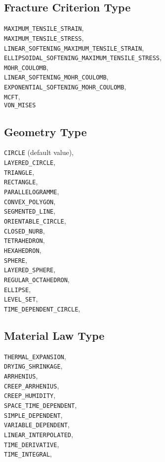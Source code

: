 \documentclass[10pt]{article}
\begin{document}
\subsection{Fracture Criterion Type}

\verb+MAXIMUM_TENSILE_STRAIN+,\\
\verb+MAXIMUM_TENSILE_STRESS+,\\
\verb+LINEAR_SOFTENING_MAXIMUM_TENSILE_STRAIN+,\\
\verb+ELLIPSOIDAL_SOFTENING_MAXIMUM_TENSILE_STRESS+,\\
\verb+MOHR_COULOMB+,\\
\verb+LINEAR_SOFTENING_MOHR_COULOMB+,\\
\verb+EXPONENTIAL_SOFTENING_MOHR_COULOMB+,\\
\verb+MCFT+,\\
\verb+VON_MISES+

\subsection{Geometry Type}

\verb+CIRCLE+ (default value),\\
\verb+LAYERED_CIRCLE+,\\
\verb+TRIANGLE+,\\
\verb+RECTANGLE+,\\
\verb+PARALLELOGRAMME+,\\
\verb+CONVEX_POLYGON+,\\
\verb+SEGMENTED_LINE+,\\
\verb+ORIENTABLE_CIRCLE+,\\
\verb+CLOSED_NURB+,\\
\verb+TETRAHEDRON+,\\
\verb+HEXAHEDRON+,\\
\verb+SPHERE+,\\
\verb+LAYERED_SPHERE+,\\
\verb+REGULAR_OCTAHEDRON+,\\
\verb+ELLIPSE+,\\
\verb+LEVEL_SET+,\\
\verb+TIME_DEPENDENT_CIRCLE+,\\

\subsection{Material Law Type}

\verb+THERMAL_EXPANSION+,\\
\verb+DRYING_SHRINKAGE+,\\
\verb+ARRHENIUS+,\\
\verb+CREEP_ARRHENIUS+,\\
\verb+CREEP_HUMIDITY+,\\
\verb+SPACE_TIME_DEPENDENT+,\\
\verb+SIMPLE_DEPENDENT+,\\
\verb+VARIABLE_DEPENDENT+,\\
\verb+LINEAR_INTERPOLATED+,\\
\verb+TIME_DERIVATIVE+,\\
\verb+TIME_INTEGRAL+,\\
\end{document}
